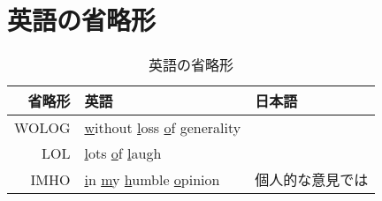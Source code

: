 \section{英語の省略形}\label{s1:英語の省略形} %
	\begin{table}[htbp] %
		\begin{center}\begin{tabular}{rll} \hline
			省略形 & 英語 & 日本語 \\ \hline
			WOLOG & \underline{w}ithout \underline{l}oss \underline{o}f
				\underline{g}enerality \\
			LOL & \underline{l}ots \underline{o}f \underline{l}augh \\
			IMHO & \underline{i}n \underline{m}y \underline{h}umble
				\underline{o}pinion & 個人的な意見では \\
		\end{tabular}\end{center}
		\caption{英語の省略形}
	\end{table} %
